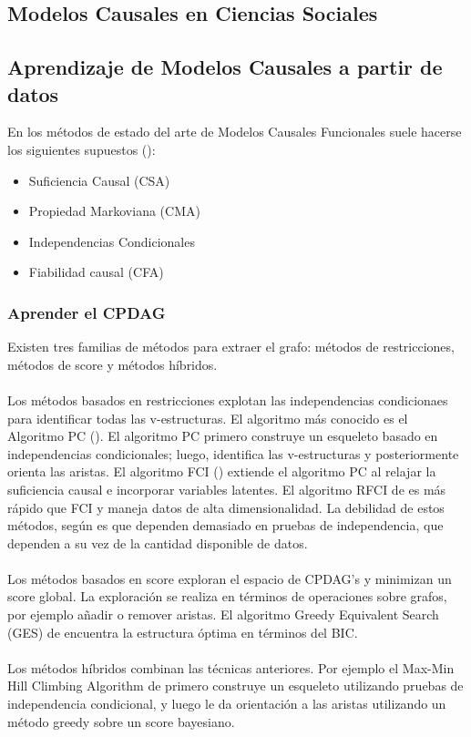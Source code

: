 \documentclass[11pt]{article}
\theoremstyle{plain}
\begin{document}
\subsection{Modelos Causales en Ciencias Sociales}
\subsection{Aprendizaje de Modelos Causales a partir de datos}
En los métodos de estado del arte de Modelos Causales Funcionales suele hacerse los siguientes supuestos (\cite{goudet2017learning}):
\begin{itemize}
\item Suficiencia Causal (CSA)
\item Propiedad Markoviana (CMA)
\item Independencias Condicionales
\item Fiabilidad causal (CFA)
\end{itemize}
\subsubsection{Aprender el CPDAG}
Existen tres familias de métodos para extraer el grafo: métodos de restricciones, métodos de score y métodos híbridos.\\
\\
Los métodos basados en restricciones explotan las independencias condicionaes para identificar todas las v-estructuras. El algoritmo más conocido es el Algoritmo PC (\cite{spirtes2000causation}). El algoritmo PC primero construye un esqueleto basado en independencias condicionales; luego, identifica las v-estructuras y posteriormente orienta las aristas. El algoritmo FCI (\cite{spirtes1999algorithm}) extiende el algoritmo PC al relajar la suficiencia causal e incorporar variables latentes. El algoritmo RFCI de \cite{colombo2012learning} es más rápido que FCI y maneja datos de alta dimensionalidad. La debilidad de estos métodos, según \cite{goudet2017learning} es que dependen demasiado en pruebas de independencia, que dependen a su vez de la cantidad disponible de datos.\\
\\
Los métodos basados en score exploran el espacio de CPDAG's y minimizan un score global. La exploración se realiza en términos de operaciones sobre grafos, por ejemplo añadir o remover aristas. El algoritmo Greedy Equivalent Search (GES) de \cite{chickering2002optimal} encuentra la estructura óptima en términos del BIC.\\
\\
Los métodos híbridos combinan las técnicas anteriores. Por ejemplo el Max-Min Hill Climbing Algorithm de \cite{tsamardinos2006max} primero construye un esqueleto utilizando pruebas de independencia condicional, y luego le da orientación a las aristas utilizando un método greedy sobre un score bayesiano.
\end{document}

